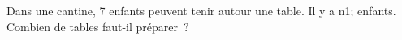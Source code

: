 \documentclass[exercice]{thedocument}%
\begin{document}
%
Dans une cantine, 7 enfants peuvent tenir autour une table. Il y a \<n1;
enfants. Combien de tables faut-il préparer~?
\end{document}
